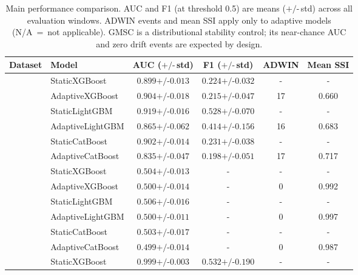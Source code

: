 \documentclass[pdflatex,sn-mathphys-num]{sn-jnl}
\theoremstyle{thmstyleone}
\theoremstyle{thmstyletwo}
\theoremstyle{thmstylethree}
\begin{document}
\begin{table}[t]
  \caption{Main performance comparison. AUC and F1 (at threshold 0.5) are
           means ($\text{+/-}$\,std) across all evaluation windows. ADWIN events and
           mean SSI apply only to adaptive models (N/A~=~not applicable).
           GMSC is a distributional stability control; its near-chance AUC
           and zero drift events are expected by design.}
  \label{tab:main_results}
  \centering\scriptsize
  \begin{tabular}{@{}llcccc@{}}
    \toprule
    Dataset & Model & AUC ($\text{+/-}$\,std) & F1 ($\text{+/-}$\,std) & ADWIN & Mean SSI \\
    \midrule
      & StaticXGBoost    & $0.899\text{+/-}0.013$ & $0.224\text{+/-}0.032$ & -  & -   \\
      & AdaptiveXGBoost  & $0.904\text{+/-}0.018$ & $0.215\text{+/-}0.047$ & 17   & 0.660 \\
      & StaticLightGBM   & $0.919\text{+/-}0.016$ & $0.528\text{+/-}0.070$ & -  & -   \\
      & AdaptiveLightGBM & $0.865\text{+/-}0.062$ & $0.414\text{+/-}0.156$ & 16   & 0.683 \\
      & StaticCatBoost   & $0.902\text{+/-}0.014$ & $0.231\text{+/-}0.038$ & -  & -   \\
      & AdaptiveCatBoost & $0.835\text{+/-}0.047$ & $0.198\text{+/-}0.051$ & 17   & 0.717 \\
    \midrule
      & StaticXGBoost    & $0.504\text{+/-}0.013$ & -             & -  & -   \\
      & AdaptiveXGBoost  & $0.500\text{+/-}0.014$ & -             &   0  & 0.992 \\
      & StaticLightGBM   & $0.506\text{+/-}0.016$ & -             & -  & -   \\
      & AdaptiveLightGBM & $0.500\text{+/-}0.011$ & -             &   0  & 0.997 \\
      & StaticCatBoost   & $0.503\text{+/-}0.017$ & -             & -  & -   \\
      & AdaptiveCatBoost & $0.499\text{+/-}0.014$ & -             &   0  & 0.987 \\
    \midrule
      & StaticXGBoost    & $0.999\text{+/-}0.003$ & $0.532\text{+/-}0.190$ & -  & -   \\

\end{tabular}
\end{table}
\end{document}
